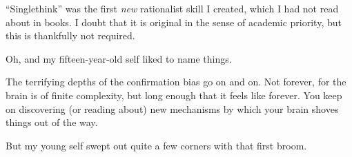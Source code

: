 {
 ``Singlethink'' was the first
\textit{new} rationalist skill I created, which I had not read about in
books. I doubt that it is original in the sense of academic priority,
but this is thankfully not required.}

{
 Oh, and my fifteen-year-old self liked to name things.}

{
 The terrifying depths of the confirmation bias go on and on. Not
forever, for the brain is of finite complexity, but long enough that it
feels like forever. You keep on discovering (or reading about) new
mechanisms by which your brain shoves things out of the way.}

{
 But my young self swept out quite a few corners with that first
broom.}

\myendsectiontext



